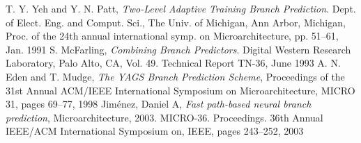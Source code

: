 \documentclass[conference]{IEEEtran}
\begin{document}
%
%
%
\begin{thebibliography}{5}

T. Y. Yeh and Y. N. Patt, \emph{Two-Level Adaptive Training Branch Prediction}. Dept. of Elect. Eng. and Comput. Sci., The Univ. of Michigan, Ann Arbor, Michigan, Proc. of the 24th annual international symp. on Microarchitecture, pp. 51–61, Jan. 1991
S. McFarling, \emph{Combining Branch Predictors}. Digital Western Research Laboratory, Palo Alto, CA, Vol. 49. Technical Report TN-36, June 1993 
A. N. Eden and T. Mudge, \emph{The YAGS Branch Prediction Scheme}, Proceedings of the 31st Annual ACM/IEEE International Symposium on Microarchitecture, MICRO 31, pages 69--77, 1998
Jim{\'e}nez, Daniel A, \emph{Fast path-based neural branch prediction}, Microarchitecture, 2003. MICRO-36. Proceedings. 36th Annual IEEE/ACM International Symposium on, IEEE, pages 243--252, 2003 

\end{thebibliography}




\end{document}
